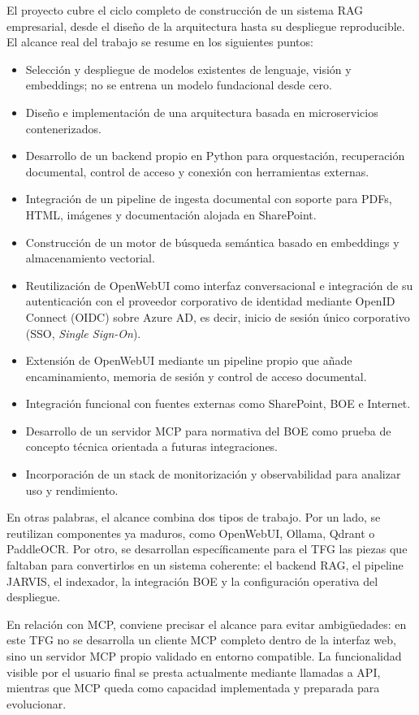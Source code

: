 El proyecto cubre el ciclo completo de construcción de un sistema RAG empresarial, desde el diseño de la arquitectura hasta su despliegue reproducible. El alcance real del trabajo se resume en los siguientes puntos:

\begin{itemize}
    \item Selección y despliegue de modelos existentes de lenguaje, visión y embeddings; no se entrena un modelo fundacional desde cero.
    \item Diseño e implementación de una arquitectura basada en microservicios contenerizados.
    \item Desarrollo de un backend propio en Python para orquestación, recuperación documental, control de acceso y conexión con herramientas externas.
    \item Integración de un pipeline de ingesta documental con soporte para PDFs, HTML, imágenes y documentación alojada en SharePoint.
    \item Construcción de un motor de búsqueda semántica basado en embeddings y almacenamiento vectorial.
    \item Reutilización de OpenWebUI como interfaz conversacional e integración de su autenticación con el proveedor corporativo de identidad mediante OpenID Connect (OIDC) sobre Azure AD, es decir, inicio de sesión único corporativo (SSO, \textit{Single Sign-On}).
    \item Extensión de OpenWebUI mediante un pipeline propio que añade encaminamiento, memoria de sesión y control de acceso documental.
    \item Integración funcional con fuentes externas como SharePoint, BOE e Internet.
    \item Desarrollo de un servidor MCP para normativa del BOE como prueba de concepto técnica orientada a futuras integraciones.
    \item Incorporación de un stack de monitorización y observabilidad para analizar uso y rendimiento.
\end{itemize}

En otras palabras, el alcance combina dos tipos de trabajo. Por un lado, se reutilizan componentes ya maduros, como OpenWebUI, Ollama, Qdrant o PaddleOCR. Por otro, se desarrollan específicamente para el TFG las piezas que faltaban para convertirlos en un sistema coherente: el backend RAG, el pipeline JARVIS, el indexador, la integración BOE y la configuración operativa del despliegue.

En relación con MCP, conviene precisar el alcance para evitar ambigüedades: en este TFG no se desarrolla un cliente MCP completo dentro de la interfaz web, sino un servidor MCP propio validado en entorno compatible. La funcionalidad visible por el usuario final se presta actualmente mediante llamadas a API, mientras que MCP queda como capacidad implementada y preparada para evolucionar.

